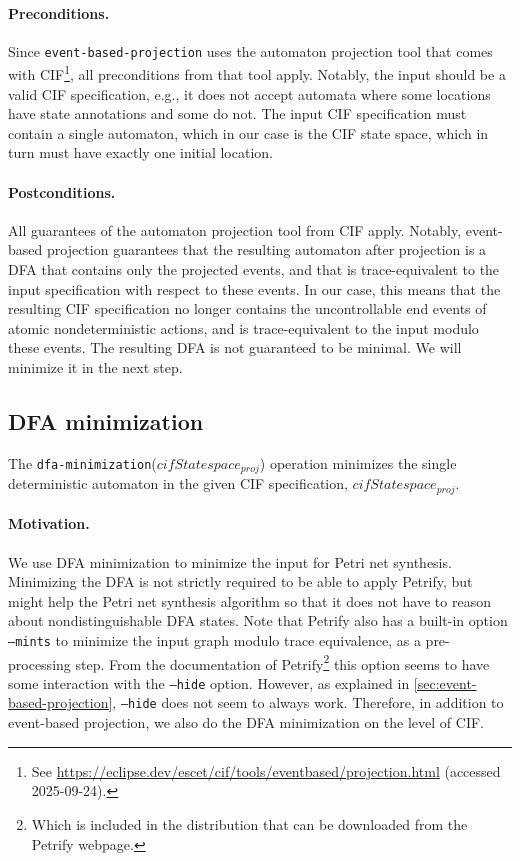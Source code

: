 \documentclass{article}
\newcommand{\keyw}[1]{\texttt{#1}}
\newcommand{\var}[1]{\ensuremath{\mathit{#1}}}
\newcommand{\eventBasedProjectionLabel}[0]{\keyw{event-based-projection}}
\newcommand{\dfaMinimizationLabel}[0]{\keyw{dfa-minimization}}
\newcommand{\dfaMinimization}[1]{\dfaMinimizationLabel(\ensuremath{#1})}
\theoremstyle{definition}
\begin{document}
\paragraph{Preconditions.}
Since \eventBasedProjectionLabel{} uses the automaton projection tool that comes with CIF\footnote{See \url{https://eclipse.dev/escet/cif/tools/eventbased/projection.html} (accessed 2025-09-24).}, all preconditions from that tool apply.
Notably, the input should be a valid CIF specification, e.g., it does not accept automata where some locations have state annotations and some do not.
The input CIF specification must contain a single automaton, which in our case is the CIF state space, which in turn must have exactly one initial location.

\paragraph{Postconditions.}
All guarantees of the automaton projection tool from CIF apply.
Notably, event-based projection guarantees that the resulting automaton after projection is a DFA that contains only the projected events, and that is trace-equivalent to the input specification with respect to these events.
In our case, this means that the resulting CIF specification no longer contains the uncontrollable end events of atomic nondeterministic actions, and is trace-equivalent to the input modulo these events.
The resulting DFA is not guaranteed to be minimal.
We will minimize it in the next step.

\subsection{DFA minimization}
\label{sec:dfa-minimization}

The \dfaMinimization{\var{cifStatespace_{proj}}} operation minimizes the single deterministic automaton in the given CIF specification, \var{cifStatespace_{proj}}.

\paragraph{Motivation.}
We use DFA minimization to minimize the input for Petri net synthesis.
Minimizing the DFA is not strictly required to be able to apply Petrify, but might help the Petri net synthesis algorithm so that it does not have to reason about nondistinguishable DFA states.
Note that Petrify also has a built-in option \texttt{--mints} to minimize the input graph modulo trace equivalence, as a pre-processing step.
From the documentation of Petrify\footnote{Which is included in the distribution that can be downloaded from the Petrify webpage.} this option seems to have some interaction with the \texttt{--hide} option.
However, as explained in \autoref{sec:event-based-projection}, \texttt{--hide} does not seem to always work.
Therefore, in addition to event-based projection, we also do the DFA minimization on the level of CIF.
\end{document}
